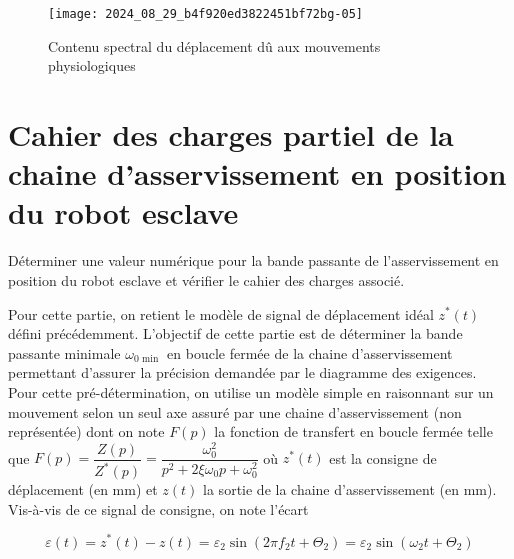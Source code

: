 

\begin{figure}[!h]
\centering
\texttt{[image: 2024\_08\_29\_b4f920ed3822451bf72bg-05]}
\caption{\label{fig_05} Contenu spectral du déplacement dû aux mouvements physiologiques}
\end{figure}


\section{Cahier des charges partiel de la chaine d'asservissement en position du robot esclave}
\begin{obj}
Déterminer une valeur numérique pour la bande passante de l'asservissement en position du robot esclave et vérifier le cahier des charges associé.
\end{obj}

Pour cette partie, on retient le modèle de signal de déplacement idéal $z^{*}(t)$ défini précédemment. L'objectif de cette partie est de déterminer la bande passante minimale $\omega_{0 \text { min }}$ en boucle fermée de la chaine d'asservissement permettant d'assurer la précision demandée par le diagramme des exigences.\\
Pour cette pré-détermination, on utilise un modèle simple en raisonnant sur un mouvement selon un seul axe assuré par une chaine d'asservissement (non représentée) dont on note $F(p)$ la fonction de transfert en boucle fermée telle que $F(p)=\dfrac{Z(p)}{Z^{*}(p)}=\dfrac{\omega_{0}^{2}}{p^{2}+2 \xi \omega_{0} p+\omega_{0}^{2}}$ où $z^{*}(t)$ est la consigne de déplacement (en mm) et $z(t)$ la sortie de la chaine d'asservissement (en mm). Vis-à-vis de ce signal de consigne, on note l'écart

$$
\varepsilon(t)=z^{*}(t)-z(t)=\varepsilon_{2} \sin \left(2 \pi f_{2} t+\Theta_{2}\right)=\varepsilon_{2} \sin \left(\omega_{2} t+\Theta_{2}\right)
$$

